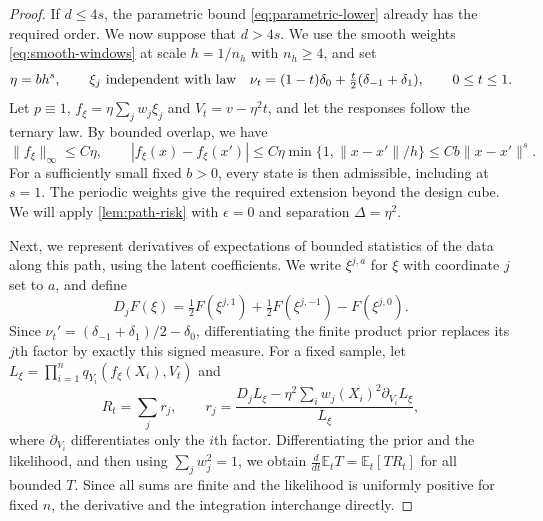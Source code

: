\begin{proof}
If $d\le4s$, the parametric bound \eqref{eq:parametric-lower} already
has the required order. We now suppose that $d>4s$. We use the
smooth weights \eqref{eq:smooth-windows} at scale $h=1/n_h$ with
$n_h\ge4$, and set
\[
 \eta=bh^s,\qquad
 \xi_j\ \hbox{independent with law}\quad
 \nu_t=(1-t)\delta_0+\tfrac t2(\delta_{-1}+\delta_1),
 \qquad 0\le t\le1.
\]
Let $p\equiv1$, $f_\xi=\eta\sum_jw_j\xi_j$ and
$V_t=v-\eta^2t$, and let the responses follow the ternary law.
By bounded overlap, we have
\[
 \|f_\xi\|_\infty\le C\eta,\qquad
 |f_\xi(x)-f_\xi(x')|
 \le C\eta\min\{1,\|x-x'\|/h\}
 \le Cb\|x-x'\|^s.
\]
For a sufficiently small fixed $b>0$, every state is then admissible,
including at $s=1$. The periodic weights give the required extension
beyond the design cube. We will apply \cref{lem:path-risk} with
$\epsilon=0$ and separation $\Delta=\eta^2$.

Next, we represent derivatives of expectations of bounded statistics of
the data along this path, using the latent coefficients. We write
$\xi^{j,a}$ for $\xi$ with coordinate $j$ set to $a$, and define
\[
 D_jF(\xi)=\tfrac12F(\xi^{j,1})+
          \tfrac12F(\xi^{j,-1})-F(\xi^{j,0}).
\]
Since $\nu_t'=(\delta_{-1}+\delta_1)/2-\delta_0$, differentiating
the finite product prior replaces its $j$th factor by exactly this
signed measure. For a fixed sample, let
$L_\xi=\prod_{i=1}^nq_{Y_i}(f_\xi(X_i),V_t)$ and
\begin{equation}\label{eq:small-s-score}
 R_t=\sum_j r_j,\qquad
 r_j=\frac{D_jL_\xi-
       \eta^2\sum_i w_j(X_i)^2\partial_{V_i}L_\xi}{L_\xi},
\end{equation}
where $\partial_{V_i}$ differentiates only the $i$th factor.
Differentiating the prior and the likelihood, and then using
$\sum_jw_j^2=1$, we obtain
$\frac d{dt}\mathbb E_tT=\mathbb E_t[TR_t]$ for all bounded $T$.
Since all sums are finite and the likelihood is uniformly positive for
fixed $n$, the derivative and the integration interchange directly.


\end{proof}
